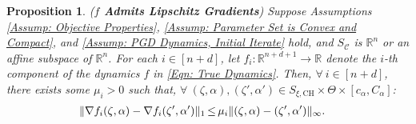 \documentclass[letterpaper, 10 pt, conference]{ieeeconf}
\newcommand{\ra}{\rightarrow}
\newcommand{\R}{\mathbb{R}}
\newcommand{\?}{\stackrel{?}{=}}
\newcommand{\paramDim}{d}
\newcommand{\paramSet}{\Theta}
\newcommand{\var}{\xi}
\newcommand{\varDim}{n}
\newcommand{\ratePGD}{\alpha}
\newcommand{\ratePGDMin}{c_\ratePGD}
\newcommand{\ratePGDMax}{C_\ratePGD}
\newcommand{\constraintSet}{{S_{\mathcal{C}}}}
\newcommand{\state}{\zeta}
\newcommand{\dynamicsFullState}{f}
\newcommand{\hessianBound}{\mu}
\newcommand{\varConvexHull}{S_{\var, \text{CH}}}
\newtheorem{proposition}{Proposition}
\begin{document}
\begin{proposition}
(\textbf{$\dynamicsFullState$ Admits Lipschitz Gradients})
\label{Prop: Lipschitz Continuity of Gradient of PGD Dynamics}
Suppose Assumptions \ref{Assump: Objective Properties}, \ref{Assump: Parameter Set is Convex and Compact}, and \ref{Assump: PGD Dynamics, Initial Iterate} hold, and $\constraintSet$ is $\R^\varDim$ or an affine subspace of $\R^\varDim$.
For each $i \in [\varDim + \paramDim]$, let $\dynamicsFullState_i: \R^{\varDim + \paramDim + 1} \ra \R$ denote the $i$-th component of the dynamics $\dynamicsFullState$ in \eqref{Eqn: True Dynamics}. 
Then, $\forall \ i \in [\varDim + \paramDim]$, there exists some $\hessianBound_i > 0$ such that, $\forall \ (\state, \ratePGD), (\state', \ratePGD') \in \varConvexHull \times \paramSet \times [\ratePGDMin, \ratePGDMax]$:
\begin{align}
    \label{Eqn: Lipschitz Continuity of Gradient of PGD Dynamics}
    &\Vert \nabla \dynamicsFullState_i(\state, \ratePGD) - \nabla \dynamicsFullState_i(\state', \ratePGD') \Vert_1 \hspace{-0.4mm} \leq \hspace{-0.4mm} \hessianBound_i \Vert (\state, \ratePGD) - (\state', \ratePGD') \Vert_\infty.
\end{align}
\end{proposition}
\end{document}
